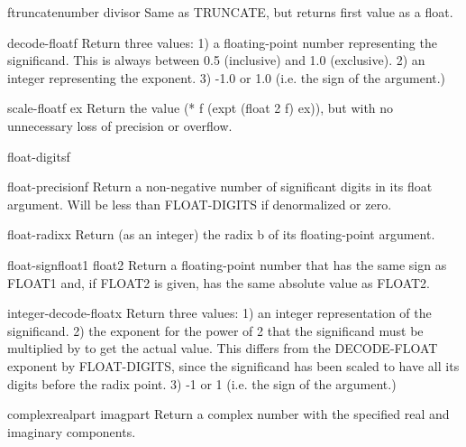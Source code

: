 \documentclass[10pt,english]{book}
\begin{document}
\begin{function}{ftruncate}{number \op divisor}
  Same as TRUNCATE, but returns first value as a float.
\end{function}

\begin{function}{decode-float}{f}
  Return three values:
   1) a floating-point number representing the significand. This is always
      between 0.5 (inclusive) and 1.0 (exclusive).
   2) an integer representing the exponent.
   3) -1.0 or 1.0 (i.e. the sign of the argument.)
\end{function}

\begin{function}{scale-float}{f ex}
  Return the value (* f (expt (float 2 f) ex)), but with no unnecessary loss
  of precision or overflow.
\end{function}

\begin{function}{float-digits}{f}
  
\end{function}

\begin{function}{float-precision}{f}
  Return a non-negative number of significant digits in its float argument.
  Will be less than FLOAT-DIGITS if denormalized or zero.
\end{function}

\begin{function}{float-radix}{x}
  Return (as an integer) the radix b of its floating-point argument.
\end{function}

\begin{function}{float-sign}{float1 \op float2}
  Return a floating-point number that has the same sign as
   FLOAT1 and, if FLOAT2 is given, has the same absolute value
   as FLOAT2.
\end{function}

\begin{function}{integer-decode-float}{x}
  Return three values:
   1) an integer representation of the significand.
   2) the exponent for the power of 2 that the significand must be multiplied
      by to get the actual value. This differs from the DECODE-FLOAT exponent
      by FLOAT-DIGITS, since the significand has been scaled to have all its
      digits before the radix point.
   3) -1 or 1 (i.e. the sign of the argument.)
\end{function}

\begin{function}{complex}{realpart \op imagpart}
  Return a complex number with the specified real and imaginary components.
\end{function}
\end{document}

